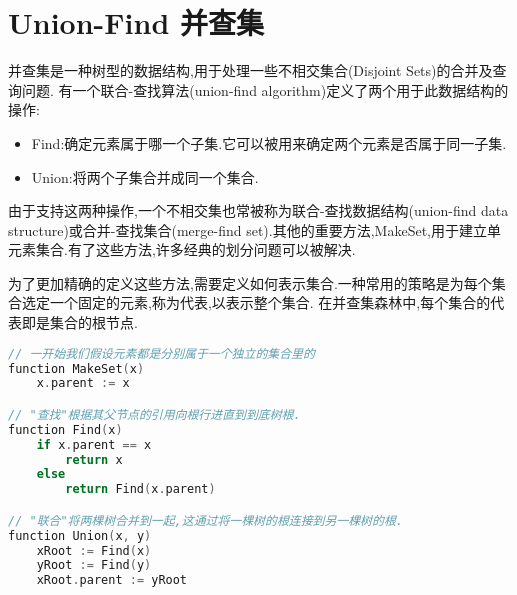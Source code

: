 \chapter{Union-Find 并查集}
并查集是一种树型的数据结构,用于处理一些不相交集合(Disjoint Sets)的合并及查询问题.
有一个联合-查找算法(union-find algorithm)定义了两个用于此数据结构的操作:
\begin{itemize}
\item Find:确定元素属于哪一个子集.它可以被用来确定两个元素是否属于同一子集.
\item Union:将两个子集合并成同一个集合.
\end{itemize}
由于支持这两种操作,一个不相交集也常被称为联合-查找数据结构(union-find data structure)或合并-查找集合(merge-find set).其他的重要方法,MakeSet,用于建立单元素集合.有了这些方法,许多经典的划分问题可以被解决.

为了更加精确的定义这些方法,需要定义如何表示集合.一种常用的策略是为每个集合选定一个固定的元素,称为代表,以表示整个集合.
在并查集森林中,每个集合的代表即是集合的根节点.

\begin{lstlisting}[language = C]
// 一开始我们假设元素都是分别属于一个独立的集合里的
function MakeSet(x)
	x.parent := x

// "查找"根据其父节点的引用向根行进直到到底树根.
function Find(x)
	if x.parent == x
		return x
	else
		return Find(x.parent)

// "联合"将两棵树合并到一起,这通过将一棵树的根连接到另一棵树的根.
function Union(x, y)
	xRoot := Find(x)
	yRoot := Find(y)
	xRoot.parent := yRoot
\end{lstlisting}

